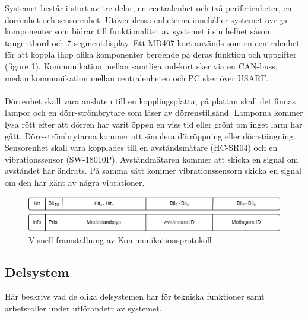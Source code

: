 \documentclass{article}
\begin{document}
Systemet består i stort av tre delar, en centralenhet och två periferienheter, en dörrenhet och sensorenhet. 
Utöver dessa enheterna innehåller systemet övriga komponenter som bidrar till funktionalitet av systemet i sin helhet såsom tangentbord och 7-segmentdisplay. Ett MD407-kort används som en centralenhet för att koppla ihop olika komponenter beroende på deras funktion och uppgifter (figure 1).
Kommunikation mellan samtliga md-kort sker via en CAN-buss, medan kommunikation mellan centralenheten och PC sker över USART. \\
\\
Dörrenhet skall vara ansluten till en kopplingsplatta, på plattan skall det finnas lampor och en dörr-strömbrytare som läser av dörrenstillsånd.
Lamporna kommer lysa rött efter att dörren har varit öppen en viss tid eller grönt om inget larm har gått. 
Dörr-strömbrytarna kommer att simulera dörröppning eller dörrstängning. 
\\
Sensorenhet skall vara kopplades till en avståndsmätare (HC-SR04) och en vibrationssensor (SW-18010P). 
Avståndmätaren kommer att skicka en signal om avståndet har ändrats. 
På samma sätt kommer vibrationssensorn skicka en signal om den har känt av några vibrationer. \\

\begin{figure}[h]
    \centering
    \includegraphics[scale=0.5]{Projektrapport/protokoll.png}
    \caption {Visuell framställning av Kommunikationsprotokoll}
    \label{fig:drawing}
\end{figure}


\subsection{Delsystem}
Här beskrivs vad de olika delsystemen har för tekniska funktioner samt arbetsroller under utförandetr av systemet. 
\end{document}
